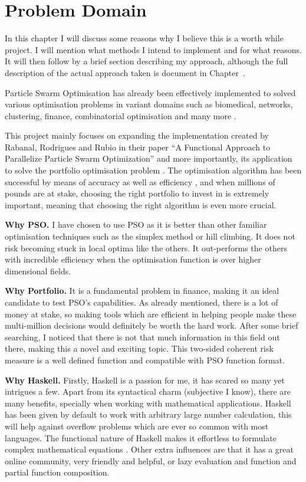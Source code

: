\chapter{Problem Domain}

  In this chapter I will discuss some reasons why I believe this is a worth while project. I will mention what methods I intend to implement and for what reasons. It will then follow by a brief section describing my approach, although the full description of the actual approach taken is document in Chapter~.
  
  Particle Swarm Optimisation has already been effectively implemented to solved various optimisation problems \cite{pso_app,pso_app2,pso_app3} in variant domains such as biomedical, networks, clustering, finance, combinatorial optimisation and many more \cite{pso_app_main}. 

  This project mainly focuses on expanding the implementation created by Rabanal, Rodrigues and Rubio in their paper ``A Functional Approach to Parallelize Particle Swarm Optimization'' and more importantly, its application to solve the portfolio optimisation problem \cite{marko2}. The optimisation algorithm has been successful by means of accuracy as well as efficiency \cite{haskellPSO}, and when millions of pounds are at stake, choosing the right portfolio to invest in is extremely important, meaning that choosing the right algorithm is even more crucial.

  \textbf{Why PSO.} I have chosen to use PSO as it is better than other familiar optimisation techniques such as the simplex method or hill climbing. It does not risk becoming stuck in local optima like the others. It out-performs the others with incredible efficiency when the optimisation function is over higher dimensional fields. 

  \textbf{Why Portfolio.} It is a fundamental problem in finance, making it an ideal candidate to test PSO's capabilities. As already mentioned, there is a lot of money at stake, so making tools which are efficient in helping people make these multi-million decisions would definitely be worth the hard work. After some brief searching, I noticed that there is not that much information in this field out there, making this a novel and exciting topic. This two-sided coherent risk measure is a well defined function and compatible with PSO function format. 

  \textbf{Why Haskell.} Firstly, Haskell is a passion for me, it has scared so many yet intrigues a few. Apart from its syntactical charm (subjective I know), there are many benefits, specially when working with mathematical applications. Haskell has been given by default to work with arbitrary large number calculation, this will help against overflow problems which are ever so common with most languages. The functional nature of Haskell makes it effortless to formulate complex mathematical equations \cite{haskellPSO}. Other extra influences are that it has a great online community, very friendly and helpful, or lazy evaluation and function and partial function composition. 

